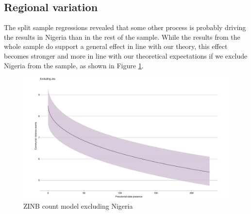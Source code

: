 \subsection{Regional variation} \label{We need to talk about Nigeria}

The split sample regressions revealed that some other process is probably driving
the results in Nigeria than in the rest of the sample. While the results from
the whole sample do support a general effect in line with our theory, this
effect becomes stronger and more in line with our theoretical expectations if we
exclude Nigeria from the sample, as shown in Figure \ref{znigeria}.

\begin{figure}[htpb]
	\centering
	\includegraphics[width=1\linewidth]{R/Output/znigeria.pdf}
	\caption{ZINB count model excluding Nigeria}%
	\label{znigeria}
\end{figure}

